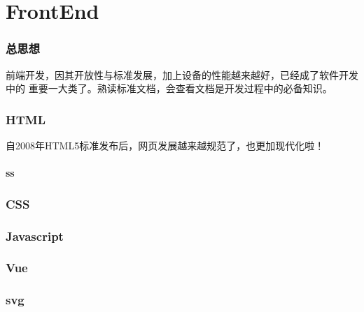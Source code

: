 \clearpage
\part{FrontEnd}

\section{总思想}
前端开发，因其开放性与标准发展，加上设备的性能越来越好，已经成了软件开发中的
重要一大类了。熟读标准文档，会查看文档是开发过程中的必备知识。

\section{HTML}
自2008年HTML5标准发布后，网页发展越来越规范了，也更加现代化啦！
\subsection{ss}

\section{CSS}

\section{Javascript}

\section{Vue}

\section{svg}
